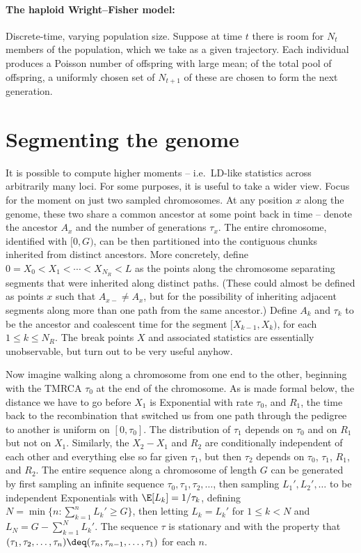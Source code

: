 \paragraph{The haploid Wright--Fisher model:}
Discrete-time, varying population size.
Suppose at time $t$ there is room for $N_t$ members of the population,
which we take as a given trajectory.
Each individual produces a Poisson number of offspring with large mean;
of the total pool of offspring, a uniformly chosen set of $N_{t+1}$ of these
are chosen to form the next generation.




\section{Segmenting the genome}

It is possible to compute higher moments -- i.e.\ LD-like statistics across arbitrarily many loci.
For some purposes, it is useful to take a wider view.
Focus for the moment on just two sampled chromosomes.
At any position $x$ along the genome, these two share a common ancestor at some point back in time --
denote the ancestor $A_x$ and the number of generations $\tau_x$.
The entire chromosome, identified with $[0,G)$,
can be then partitioned into the contiguous chunks inherited from distinct ancestors.
More concretely, define $0 = X_0 < X_1 < \cdots < X_{N_R} < L$ as the points along the chromosome 
separating segments that were inherited along distinct paths.
(These could almost be defined as points $x$ such that $A_{x-} \neq A_x$,
but for the possibility of inheriting adjacent segments along more than one path from the same ancestor.)
Define $A_k$ and $\tau_k$ to be the ancestor and coalescent time for the segment $[X_{k-1},X_k)$, for each $1 \le k \le N_R$.
The break points $X$ and associated statistics are essentially unobservable,
but turn out to be very useful anyhow.

Now imagine walking along a chromosome from one end to the other, beginning with the TMRCA $\tau_0$ at the end of the chromosome.
As is made formal below,
the distance we have to go before $X_1$ is Exponential with rate $\tau_0$,
and $R_1$, the time back to the recombination that switched us from one path through the pedigree to another is uniform on $[0,\tau_0]$.
The distribution of $\tau_1$ depends on $\tau_0$ and on $R_1$ but not on $X_1$.
Similarly, the $X_2-X_1$ and $R_2$ are conditionally independent of each other and everything else so far given $\tau_1$,
but then $\tau_2$ depends on $\tau_0$, $\tau_1$, $R_1$, and $R_2$.
The entire sequence along a chromosome of length $G$ can be generated
by first sampling an infinite sequence $\tau_0,\tau_1,\tau_2,\ldots$,
then sampling $L_1', L_2', \ldots$ to be independent Exponentials with $\E[L_k] = 1/\tau_k$,
defining $N = \min \{n : \sum_{k =1}^n L_k' \ge G \}$,
then letting $L_k = L_k'$ for $1 \le k < N$ and $L_N = G - \sum_{k =1}^N L_k'$.
The sequence $\tau$ is stationary
and with the property that $(\tau_1, \tau_2, \ldots, \tau_n) \deq  (\tau_n, \tau_{n-1}, \ldots, \tau_1)$ for each $n$.


